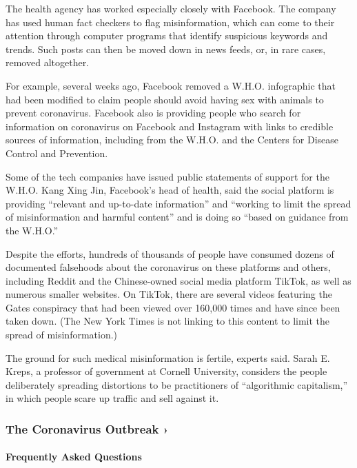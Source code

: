 The health agency has worked especially closely with Facebook. The
company has used human fact checkers to flag misinformation, which can
come to their attention through computer programs that identify
suspicious keywords and trends. Such posts can then be moved down in
news feeds, or, in rare cases, removed altogether.

For example, several weeks ago, Facebook removed a W.H.O. infographic
that had been modified to claim people should avoid having sex with
animals to prevent coronavirus. Facebook also is providing people who
search for information on coronavirus on Facebook and Instagram with
links to credible sources of information, including from the W.H.O. and
the Centers for Disease Control and Prevention.

Some of the tech companies have issued public statements of support for
the W.H.O. Kang Xing Jin, Facebook's head of health, said the social
platform is providing ``relevant and up-to-date information'' and
``working to limit the spread of misinformation and harmful content''
and is doing so ``based on guidance from the W.H.O.''

Despite the efforts, hundreds of thousands of people have consumed
dozens of documented falsehoods about the coronavirus on these platforms
and others, including Reddit and the Chinese-owned social media platform
TikTok, as well as numerous smaller websites. On TikTok, there are
several videos featuring the Gates conspiracy that had been viewed over
160,000 times and have since been taken down. (The New York Times is not
linking to this content to limit the spread of misinformation.)

The ground for such medical misinformation is fertile, experts said.
Sarah E. Kreps, a professor of government at Cornell University,
considers the people deliberately spreading distortions to be
practitioners of ``algorithmic capitalism,'' in which people scare up
traffic and sell against it.

\href{https://www.nytimes.com/news-event/coronavirus?action=click\&pgtype=Article\&state=default\&region=MAIN_CONTENT_3\&context=storylines_faq}{}

\hypertarget{the-coronavirus-outbreak-}{%
\subsubsection{The Coronavirus Outbreak
›}\label{the-coronavirus-outbreak-}}

\hypertarget{frequently-asked-questions}{%
\paragraph{Frequently Asked
Questions}\label{frequently-asked-questions}}

